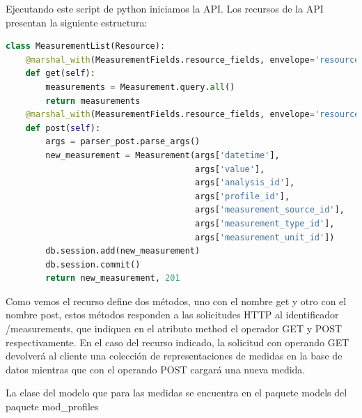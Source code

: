\documentclass[a4paper,12pt]{article}
\begin{document}
\begin{itemize}
Ejecutando este script de python iniciamos la API.
Los recursos de la API presentan la siguiente estructura:

\begin{lstlisting}[language=Python]
class MeasurementList(Resource):
    @marshal_with(MeasurementFields.resource_fields, envelope='resource')
    def get(self):
        measurements = Measurement.query.all()
        return measurements
    @marshal_with(MeasurementFields.resource_fields, envelope='resource')
    def post(self):
        args = parser_post.parse_args()
        new_measurement = Measurement(args['datetime'],
                                      args['value'],
                                      args['analysis_id'],
                                      args['profile_id'],
                                      args['measurement_source_id'],
                                      args['measurement_type_id'],
                                      args['measurement_unit_id'])
        db.session.add(new_measurement)
        db.session.commit()
        return new_measurement, 201
\end{lstlisting}

Como vemos el recurso define dos métodos, uno con el nombre get y otro con el nombre post, estos métodos responden a las solicitudes HTTP al identificador /measurements, que indiquen en el atributo method el operador GET y POST respectivamente. En el caso del recurso indicado, la solicitud con operando GET devolverá al cliente una colección de representaciones de medidas en la base de datos mientras que con el operando POST cargará una nueva medida.

La clase del modelo que para las medidas se encuentra en el paquete models del paquete mod\_profiles


\end{itemize}
\end{document}
